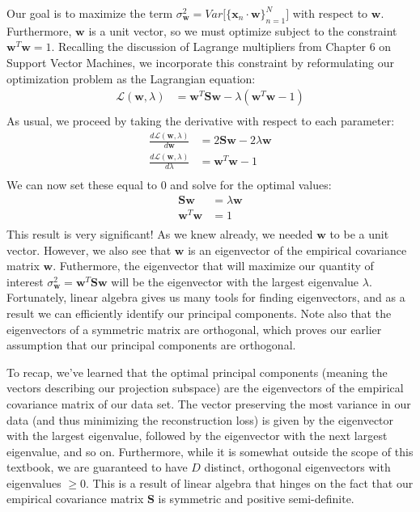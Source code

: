 Our goal is to maximize the term $\sigma^{2}_{\textbf{w}} = Var\big[\{\textbf{x}_{n} \cdot \textbf{w}\}_{n=1}^{N}\big]$ with respect to $\textbf{w}$. Furthermore, $\textbf{w}$ is a unit vector, so we must optimize subject to the constraint $\textbf{w}^{T}\textbf{w} = 1$. Recalling the discussion of Lagrange multipliers from Chapter 6 on Support Vector Machines, we incorporate this constraint by reformulating our optimization problem as the Lagrangian equation:
\begin{align*}
    \mathcal{L}(\textbf{w}, \lambda) &= \textbf{w}^{T} \textbf{S} \textbf{w} - \lambda(\textbf{w}^{T}\textbf{w} - 1) \\
\end{align*}
As usual, we proceed by taking the derivative with respect to each parameter:
\begin{align*}
    \frac{d\mathcal{L}(\textbf{w}, \lambda)}{d\textbf{w}} &= 2\textbf{S} \textbf{w} - 2\lambda\textbf{w} \\
    \frac{d\mathcal{L}(\textbf{w}, \lambda)}{d\lambda} &= \textbf{w}^{T}\textbf{w} - 1 \\
\end{align*}
We can now set these equal to 0 and solve for the optimal values:
\begin{align*}
    \textbf{S} \textbf{w} &= \lambda\textbf{w} \\
    \textbf{w}^{T}\textbf{w} &= 1 \\
\end{align*}
This result is very significant! As we knew already, we needed $\textbf{w}$ to be a unit vector. However, we also see that $\textbf{w}$ is an eigenvector of the empirical covariance matrix $\textbf{w}$. Futhermore, the eigenvector that will maximize our quantity of interest $\sigma^{2}_{\textbf{w}} = \textbf{w}^{T} \textbf{S} \textbf{w}$ will be the eigenvector with the largest eigenvalue $\lambda$. Fortunately, linear algebra gives us many tools for finding eigenvectors, and as a result we can efficiently identify our principal components. Note also that the eigenvectors of a symmetric matrix are orthogonal, which proves our earlier assumption that our principal components are orthogonal.


To recap, we've learned that the optimal principal components (meaning the vectors describing our projection subspace) are the eigenvectors of the empirical covariance matrix of our data set. The vector preserving the most variance in our data (and thus minimizing the reconstruction loss) is given by the eigenvector with the largest eigenvalue, followed by the eigenvector with the next largest eigenvalue, and so on. Furthermore, while it is somewhat outside the scope of this textbook, we are guaranteed to have $D$ distinct, orthogonal eigenvectors with eigenvalues $\geq 0$. This is a result of linear algebra that hinges on the fact that our empirical covariance matrix $\textbf{S}$ is symmetric and positive semi-definite.

